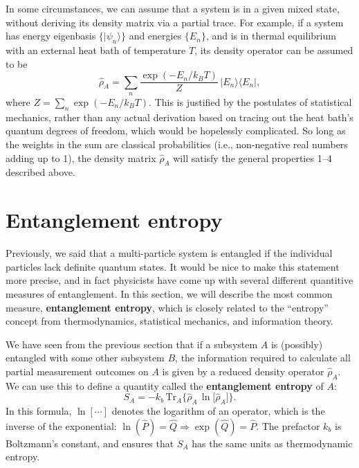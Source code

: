 \documentclass[prx,12pt]{revtex4-2}
\begin{document}
In some circumstances, we can assume that a system is in a given mixed
state, without deriving its density matrix via a partial trace.  For
example, if a system has energy eigenbasis $\{|\psi_n\rangle\}$ and
energies $\{E_n\}$, and is in thermal equilibrium with an external
heat bath of temperature $T$, its density operator can be assumed to
be
\begin{equation}
  \hat{\rho}_A = \sum_{n} \frac{\exp(-E_n/k_BT)}{Z} \, |E_n\rangle\langle E_n|,
\end{equation}
where $Z = \sum_n \exp(-E_n/k_BT)$.  This is justified by the
postulates of statistical mechanics, rather than any actual derivation
based on tracing out the heat bath's quantum degrees of freedom, which
would be hopelessly complicated.  So long as the weights in the sum
are classical probabilities (i.e., non-negative real numbers adding up
to 1), the density matrix $\hat{\rho}_A$ will satisfy the general
properties 1--4 described above.

\section{Entanglement entropy}
\label{sec:entropy}

Previously, we said that a multi-particle system is entangled if the
individual particles lack definite quantum states.  It would be nice
to make this statement more precise, and in fact physicists have come
up with several different quantitive measures of entanglement.  In
this section, we will describe the most common measure,
\textbf{entanglement entropy}, which is closely related to the
``entropy'' concept from thermodynamics, statistical mechanics, and
information theory.

We have seen from the previous section that if a subsystem $A$ is
(possibly) entangled with some other subsystem $B$, the information
required to calculate all partial measurement outcomes on $A$ is given
by a reduced density operator $\hat{\rho}_A$.  We can use this to
define a quantity called the \textbf{entanglement entropy} of $A$:
\begin{equation}
  S_{A} = - k_b \, \mathrm{Tr}_A \Big\{ \hat{\rho}_A\, \ln\!\big[\hat{\rho}_A\big]\Big\}.
  \label{entropy}
\end{equation}
In this formula, $\ln[\cdots]$ denotes the logarithm of an operator,
which is the inverse of the exponential: $\ln(\hat{P}) = \hat{Q}
\Rightarrow \exp(\hat{Q}) = \hat{P}$.  The prefactor $k_b$ is
Boltzmann's constant, and ensures that $S_A$ has the same units as
thermodynamic entropy.
\end{document}
